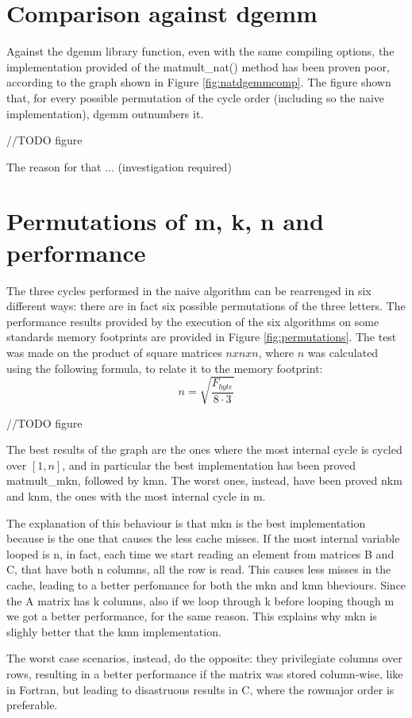  
\section{Comparison against dgemm}

Against the dgemm library function, even with the same compiling options, the implementation provided of the matmult\_nat() method has been proven poor, according to the graph shown in Figure \ref{fig:natdgemmcomp}. The figure shown that, for every possible permutation of the cycle order (including so the naive implementation), dgemm outnumbers it.

//TODO figure

The reason for that ... (investigation required)

\section{Permutations of m, k, n and performance}
The three cycles performed in the naive algorithm can be rearrenged in six different ways: there are in fact six possible permutations of the three letters. The performance results provided by the execution of the six algorithms on some standards memory footprints are provided in Figure \ref{fig:permutations}. The test was made on the product of square matrices $nxnxn$, where $n$ was calculated using the following formula, to relate it to the memory footprint:
$$
n = \sqrt{\frac{F_{byte}}{8 \cdot 3} }
$$

//TODO figure

The best results of the graph are the ones where the most internal cycle is cycled over $[1,n]$, and in particular the best implementation has been proved matmult\_mkn, followed by kmn. The worst ones, instead, have been proved nkm and knm, the ones with the most internal cycle in m.

The explanation of this behaviour is that mkn is the best implementation because is the one that causes the less cache misses. If the most internal variable looped is n, in fact, each time we start reading an element from matrices B and C, that have both n columns, all the row is read. This causes less misses in the cache, leading to a better perfomance for both the mkn and kmn bheviours. Since the A matrix has k columns, also if we loop through k before looping though m we got a better performance, for the same reason. This explains why mkn is slighly better that  the kmn implementation.

The worst case scenarios, instead, do the opposite: they privilegiate columns over rows, resulting in a better performance if the matrix was stored column-wise, like in Fortran, but leading to disastruous results in C, where the rowmajor order is preferable.

